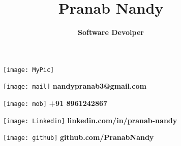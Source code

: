 \documentclass[12pt]{article}
\title{\textbf{Pranab Nandy}}
\author{\textbf{Software Devolper}}
\date{}
\begin{document}
\begin{figure}[!hbt]
\begin{minipage}{0.28\textwidth}
\texttt{[image: MyPic]}
\end{minipage}
\hfill
\begin{minipage}{0.45\textwidth}
\maketitle
\end{minipage}
\end{figure}




\begin{figure}[!hbt]

\begin{minipage}{0.35\textwidth}

\texttt{[image: mail]}
\textbf{nandypranab3@gmail.com}
\end{minipage}
\hfill
\begin{minipage}{0.48\textwidth}
\texttt{[image: mob]}
\textbf{+91 8961242867}
\end{minipage}
\hfill
\begin{minipage}{0.48\textwidth}
	\texttt{[image: Linkedin]}
	\textbf{linkedin.com/in/pranab-nandy}
\end{minipage}
\hfill
\begin{minipage}{0.48\textwidth}
	\texttt{[image: github]}
	\textbf{github.com/PranabNandy}
\end{minipage}

\end{figure}
\end{document}
